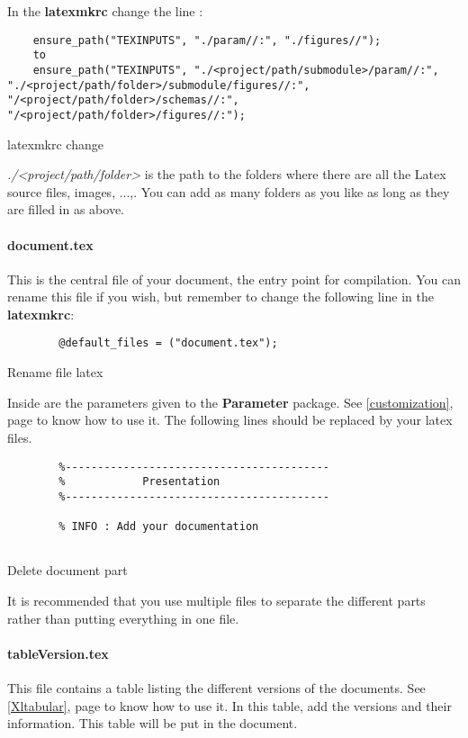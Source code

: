 In the \textbf{latexmkrc} change the line :
\begin{code}
    \begin{verbatim}
    ensure_path("TEXINPUTS", "./param//:", "./figures//");
    to
    ensure_path("TEXINPUTS", "./<project/path/submodule>/param//:", "./<project/path/folder>/submodule/figures//:", "/<project/path/folder>/schemas//:", "/<project/path/folder>/figures//:");
\end{verbatim}
    \caption{latexmkrc change}
\end{code}

\emph{./<project/path/folder>} is the path to the folders where there are all the Latex source
files, images, ...,.
You can add as many folders as you like as long as they are filled in as above.

\paragraph{document.tex}
This is the central file of your document, the entry point for compilation.
You can rename this file if you wish, but remember to change the following line in the
\textbf{latexmkrc}:

\begin{code}
    \begin{verbatim}
        @default_files = ("document.tex");
    \end{verbatim}
    \caption{Rename file \gls{latex}}
\end{code}

Inside are the parameters given to the \textbf{Parameter} package. See \ref{customization}, page
\pageref{customization} to know how to use it.
The following lines should be replaced by your \gls{latex} files.

\begin{code}
    \begin{verbatim}
        %-----------------------------------------
        %            Presentation
        %-----------------------------------------

        % INFO : Add your documentation
        
    \end{verbatim}
    \caption{Delete document part}
\end{code}

It is recommended that you use multiple files to separate the different parts rather than putting
everything in one file.

\paragraph{tableVersion.tex}
This file contains a table listing the different versions of the documents. See \ref{Xltabular},
page \pageref{Xltabular} to know how to use it.
In this table, add the versions and their information.
This table will be put in the document.\newline

